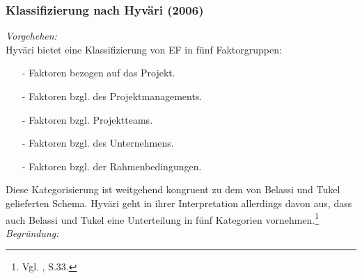 \noindent
\subsubsection{Klassifizierung nach Hyväri (2006)}
\textit{Vorgehehen:}\\\noindent
Hyväri bietet eine Klassifizierung von EF in fünf Faktorgruppen:
\begin{itemize}\itemsep0pt
\item[-]Faktoren bezogen auf das Projekt.
\item[-]Faktoren bzgl. des Projektmanagements.
\item[-]Faktoren bzgl. Projektteams.
\item[-]Faktoren bzgl. des Unternehmens.
\item[-]Faktoren bzgl. der Rahmenbedingungen.
\end{itemize}
Diese Kategorisierung ist weitgehend kongruent zu dem von Belassi und Tukel gelieferten Schema. Hyväri geht in ihrer Interpretation
allerdings davon aus, dass auch Belassi und 
Tukel eine Unterteilung in fünf Kategorien vornehmen.\footnote{Vgl. \cite{Hyvari.2006}, S.33.}\\

\textit{Begründung:}\\\noindent


